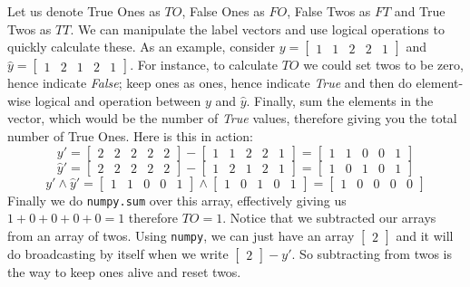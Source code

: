\documentclass[12pt,reqno]{amsart}
\newcommand{\code}[1]{\texttt{#1}}
\begin{document}
\vspace{2mm}
Let us denote True Ones as $TO$, False Ones as $FO$, False Twos as $FT$ and True Twos as $TT$. We can manipulate the label vectors and use logical operations to quickly calculate these. As an example, consider $y = \left[\begin{matrix} 1 & 1 & 2 & 2 & 1 \end{matrix} \right]$ and $\hat{y} =\left[\begin{matrix}  1 & 2 & 1 & 2 & 1\end{matrix} \right]$. For instance, to calculate $TO$ we could set twos to be zero, hence indicate \textit{False}; keep ones as ones, hence indicate \textit{True} and then do element-wise logical and operation between $y$ and $\hat{y}$. Finally, sum the elements in the vector, which would be the number of \textit{True} values, therefore giving you the total number of True Ones. Here is this in action:
$$
y' = \left[\begin{matrix} 2 & 2 & 2 & 2 & 2 \end{matrix} \right] - \left[\begin{matrix} 1 & 1 & 2 & 2 & 1 \end{matrix} \right] = \left[\begin{matrix} 1 & 1 & 0 & 0 & 1 \end{matrix} \right]
$$
$$
\hat{y}' = \left[\begin{matrix} 2 & 2 & 2 & 2 & 2 \end{matrix} \right] - \left[\begin{matrix}1 & 2 & 1 & 2 & 1 \end{matrix} \right] = \left[\begin{matrix} 1 & 0 & 1 & 0 & 1\end{matrix} \right]
$$
$$
y' \land \hat{y}' = \left[\begin{matrix} 1 & 1 & 0 & 0 & 1 \end{matrix} \right] \land \left[\begin{matrix} 1 & 0 & 1 & 0 & 1\end{matrix} \right] =  \left[\begin{matrix} 1 & 0 & 0 & 0 & 0 \end{matrix} \right]
$$
Finally we do \code{numpy.sum} over this array, effectively giving us $1 + 0 + 0 + 0 + 0 = 1$
therefore $TO = 1$. Notice that we subtracted our arrays from an array of twos. Using \code{numpy}, we can just have an array $\left[\begin{matrix} 2 \end{matrix} \right]$ and it will do broadcasting by itself when we write $\left[\begin{matrix} 2 \end{matrix} \right] - y'$. So subtracting from twos is the way to keep ones alive and reset twos. \\
\end{document}
